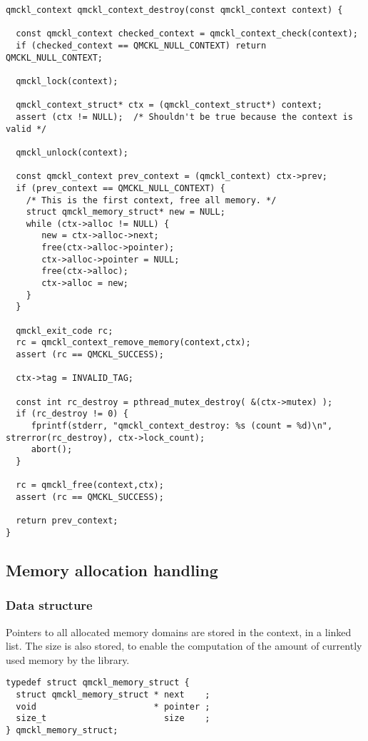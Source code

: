 \begin{verbatim}
qmckl_context qmckl_context_destroy(const qmckl_context context) {

  const qmckl_context checked_context = qmckl_context_check(context);
  if (checked_context == QMCKL_NULL_CONTEXT) return QMCKL_NULL_CONTEXT;

  qmckl_lock(context);
  
  qmckl_context_struct* ctx = (qmckl_context_struct*) context;
  assert (ctx != NULL);  /* Shouldn't be true because the context is valid */

  qmckl_unlock(context);

  const qmckl_context prev_context = (qmckl_context) ctx->prev;
  if (prev_context == QMCKL_NULL_CONTEXT) {
    /* This is the first context, free all memory. */
    struct qmckl_memory_struct* new = NULL;
    while (ctx->alloc != NULL) {
       new = ctx->alloc->next;
       free(ctx->alloc->pointer);
       ctx->alloc->pointer = NULL;
       free(ctx->alloc);
       ctx->alloc = new;
    }
  }
  
  qmckl_exit_code rc;
  rc = qmckl_context_remove_memory(context,ctx);
  assert (rc == QMCKL_SUCCESS);

  ctx->tag = INVALID_TAG;

  const int rc_destroy = pthread_mutex_destroy( &(ctx->mutex) );
  if (rc_destroy != 0) {
     fprintf(stderr, "qmckl_context_destroy: %s (count = %d)\n", strerror(rc_destroy), ctx->lock_count);
     abort();
  }

  rc = qmckl_free(context,ctx);
  assert (rc == QMCKL_SUCCESS);

  return prev_context;
}
\end{verbatim}
\subsection{Memory allocation handling}
\label{sec:orgefbc5fb}

\subsubsection{Data structure}
\label{sec:orgdddff50}

Pointers to all allocated memory domains are stored in the context,
in a linked list. The size is also stored, to enable the
computation of the amount of currently used memory by the library.

\begin{verbatim}
typedef struct qmckl_memory_struct {
  struct qmckl_memory_struct * next    ;
  void                       * pointer ;
  size_t                       size    ;
} qmckl_memory_struct;
\end{verbatim}

